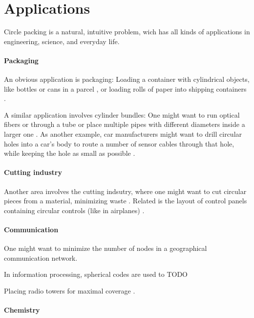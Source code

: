 \section{Applications}

Circle packing is a natural, intuitive problem, wich has all kinds of applications in engineering, science, and everyday life.

\paragraph{Packaging}

An obvious application is packaging: Loading a container with cylindrical objects, like bottles or cans in a parcel \parencite{CKP2008solving}, or loading rolls of paper into shipping containers \parencite{fraser1994integrated}.

A similar application involves cylinder bundles:
One might want to run optical fibers or through a tube or place multiple pipes with different diameters inside a larger one \parencite{WHZX2002improved}. As another example, car manufacturers might want to drill circular holes into a car's body to route a number of sensor cables through that hole, while keeping the hole as small as possible \cite{SSSKK2004disk}.

\paragraph{Cutting industry}

Another area involves the cutting indsutry, where one might want to cut circular pieces from a material, minimizing waste \cite{SMCSCG2007new}.
Related is the layout of control panels containing circular controls (like in airplanes) \parencite{CKP2008solving}.

\paragraph{Communication}

One might want to minimize the number of nodes in a geographical communication network.

In information processing, spherical codes are used to TODO

Placing radio towers for maximal coverage \parencite{SMCSCG2007new}.

\paragraph{Chemistry}


